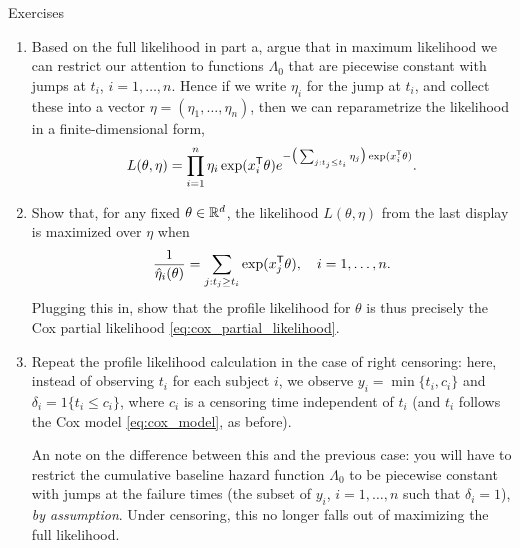 \begin{xcb}{Exercises}
\begin{enumerate}[label=\thechapter.\arabic*]
\begin{enumerate}[label=\alph*.]
\item Based on the full likelihood in part a, argue that in maximum likelihood 
  we can restrict our attention to functions $\Lambda_0$ that are piecewise
  constant with jumps at $t_i$, $i=1,\ldots,n$. Hence if we write $\eta_i$ for  
  the jump at $t_i$, and collect these into a vector $\eta = (\eta_1, \ldots,
  \eta_n)$, then we can reparametrize the likelihood in a finite-dimensional
  form,     
  \[
  L(\theta, \eta) = \prod_{i=1}^n \eta_i \exp(x_i^{\mathsf{T}} \theta)
  e^{-\big(\sum_{j : t_j \leq t_i} \eta_j\big) \exp(x_i^{\mathsf{T}} \theta)}. 
  \]

\item Show that, for any fixed $\theta \in \mathbb{R}^d$, the likelihood $L(\theta,
  \eta)$ from the last display is maximized over $\eta$ when
  \[
  \frac{1}{\hat\eta_i(\theta)} = \sum_{j : t_j \geq t_i} \exp(x_j^{\mathsf{T}} \theta),
  \quad i=1,\ldots,n. 
  \]
  Plugging this in, show that the profile likelihood for $\theta$ is thus
  precisely the Cox partial likelihood \eqref{eq:cox_partial_likelihood}. 

\item Repeat the profile likelihood calculation in the case of right censoring:
  here, instead of observing $t_i$ for each subject $i$, we observe $y_i =
  \min\{t_i, c_i\}$ and $\delta_i = 1\{t_i \leq c_i\}$, where $c_i$ is a
  censoring time independent of $t_i$ (and $t_i$ follows the Cox model
  \eqref{eq:cox_model}, as before).     

  \smallskip
  An note on the difference between this and the previous case: you will have to
  restrict the cumulative baseline hazard function $\Lambda_0$ to be piecewise
  constant with jumps at the failure times (the subset of $y_i$, $i=1,\ldots,n$
  such that $\delta_i = 1$), \emph{by assumption}. Under censoring, this no
  longer falls out of maximizing the full likelihood.              
\end{enumerate} 
\end{enumerate}
\end{xcb}